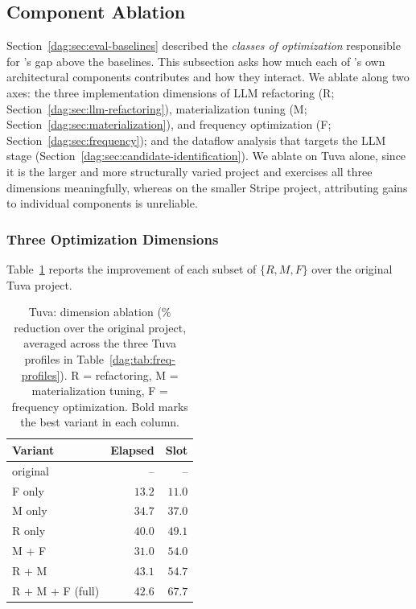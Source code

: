 \subsection{Component Ablation}
\label{dag:sec:eval-attribution}

Section~\ref{dag:sec:eval-baselines} described the \emph{classes of optimization} responsible for \dagsmith{}'s gap above the baselines. This subsection asks how much each of \dagsmith{}'s own architectural components contributes and how they interact.
We ablate along two axes: the three implementation dimensions of LLM refactoring (R; Section~\ref{dag:sec:llm-refactoring}), materialization tuning (M; Section~\ref{dag:sec:materialization}), and frequency optimization (F; Section~\ref{dag:sec:frequency}); and the dataflow analysis that targets the LLM stage (Section~\ref{dag:sec:candidate-identification}). We ablate on Tuva alone, since it is the larger and more structurally varied project and exercises all three dimensions meaningfully, whereas on the smaller Stripe project, attributing gains to individual components is unreliable. 

\subsubsection{Three Optimization Dimensions}
\label{dag:sec:eval-ablation-rmf}

Table~\ref{dag:tab:ablation-rmf} reports the improvement of each subset of $\{R, M, F\}$ over the original Tuva project.

\begin{table}[tb]
\centering
\caption{Tuva: dimension ablation (\% reduction over the original project, averaged across the three Tuva profiles in Table~\ref{dag:tab:freq-profiles}). R = refactoring, M = materialization tuning, F = frequency optimization. Bold marks the best variant in each column. }
\inv
\label{dag:tab:ablation-rmf}
\small
\begin{tabular}{lrr}
\toprule
Variant & Elapsed & Slot \\
\midrule
original         & --              & --              \\
F only           & $13.2$          & $11.0$          \\
M only           & $34.7$          & $37.0$          \\
R only           & $40.0$          & $49.1$          \\
M + F            & $31.0$          & $54.0$          \\
R + M            & $\mathbf{43.1}$          & $54.7$          \\
R + M + F (full) & $42.6$ & $\mathbf{67.7}$ \\
\bottomrule
\end{tabular}
\inv
\end{table}

